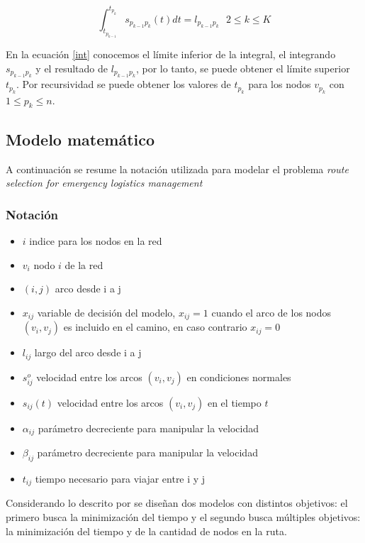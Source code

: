 \begin{equation}\label{int}
\int_{t_{p_{k-1}}}^{t_{p_k}} s_{p_{k-1}p_k}(t)dt = l_{p_{k-1}p_k} \text{  \(2 \leq k \leq  K\)}
 \end{equation}
 
En la ecuación \eqref{int} conocemos el límite inferior de la integral, el integrando $ s_{p_{k-1}p_k}$ y el resultado de $ l_{p_{k-1}p_k} $, por lo tanto, se puede obtener el límite superior $t_{p_k}$.
Por recursividad se puede obtener los valores de $t_{p_k}$ para los nodos $v_{p_k}$ con  $1\leq p_k \leq n$.

\subsection{Modelo matemático}
A continuación se resume la notación utilizada para modelar el problema \textit{route selection for emergency logistics management}
\subsubsection{Notación}
\begin{itemize}
	\item $i$  indice para los nodos en la red
	\item $v_i$ nodo $i$ de la red
 	\item $(i,j)$ arco desde i a j
	\item $x_{ij}$ variable de decisión del modelo, $x_{ij} = 1 $ cuando el arco de los nodos $(v_i,v_j)$ es incluido en el camino, en caso contrario $x_{ij} = 0$
	\item $l_{ij}$ largo del arco desde i a j
	\item $s^{o}_{ij}$  velocidad entre los arcos $(v_i, v_j)$ en condiciones normales
	\item $s_{ij}(t)$ velocidad entre los arcos $(v_i, v_j)$ en el tiempo $t$
	\item $\alpha_{ij}$ parámetro decreciente para manipular la velocidad           
	\item $\beta_{ij}$ parámetro decreciente para manipular la velocidad             
	\item $t_{ij}$ tiempo necesario para viajar entre i y j                      
\end{itemize}

Considerando lo descrito por \cite{southworth1991regional,cova2003network} se diseñan dos modelos con distintos objetivos: el primero busca la minimización del tiempo y el segundo busca múltiples objetivos: la minimización del tiempo y de la cantidad de nodos en la ruta.

